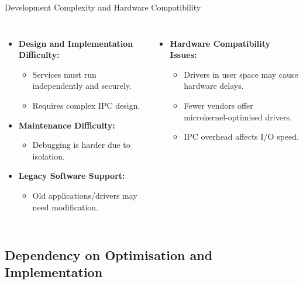 \documentclass[aspectratio=169, table]{beamer}
\begin{document}
\begin{frame}{\LARGE{Development Complexity and Hardware Compatibility}}
\vspace{20pt}
\begin{columns}
\begin{itemize}
	\item \textbf{Design and Implementation Difficulty:}
	\begin{itemize}
		\item Services must run independently and securely.
		\item Requires complex IPC design.
	\end{itemize}
	\item \textbf{Maintenance Difficulty:}
	\begin{itemize}
		\item Debugging is harder due to isolation.
	\end{itemize}
	\item \textbf{Legacy Software Support:}
	\begin{itemize}
		\item Old applications/drivers may need modification.
	\end{itemize}
\end{itemize}
\begin{itemize}
	\item \textbf{Hardware Compatibility Issues:}
	\begin{itemize}
		\item Drivers in user space may cause hardware delays.
		\item Fewer vendors offer microkernel-optimised drivers.
		\item IPC overhead affects I/O speed.
	\end{itemize}
\end{itemize}
\end{columns}
\end{frame}

\subsection{Dependency on Optimisation and Implementation}
\end{document}
